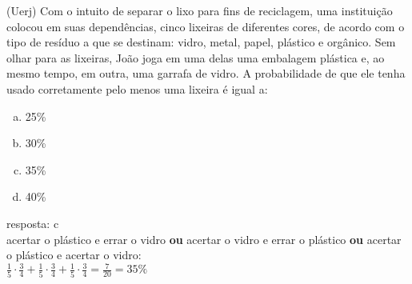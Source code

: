 \begin{ex}
(Uerj) Com o intuito de separar o lixo para fins de reciclagem, uma instituição colocou em suas dependências, cinco lixeiras de diferentes cores, de acordo com o tipo de resíduo a que se destinam: vidro, metal, papel, plástico e orgânico.	Sem olhar para as lixeiras, João joga em uma delas uma embalagem plástica e, ao mesmo tempo, em outra, uma garrafa de vidro. A probabilidade de que ele tenha usado corretamente pelo menos uma lixeira é igual a:
   \begin{enumerate}[(a)]
   \item 25\%
   \item 30\%
   \item 35\%
   \item 40\%
   \end{enumerate}
     \begin{sol}
      resposta: c \\
      acertar o plástico e errar o vidro \textbf{ou} acertar o vidro e errar o plástico \textbf{ou} acertar o plástico e acertar o vidro:\\
      $\frac{1}{5}\cdot\frac{3}{4}+\frac{1}{5}\cdot\frac{3}{4}+\frac{1}{5}\cdot\frac{3}{4}=\frac{7}{20}=35\%$
     \end{sol}
\end{ex}